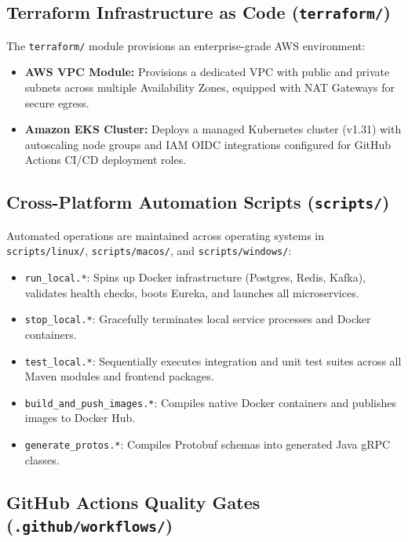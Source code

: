 \documentclass[12pt, a4paper]{article}
\begin{document}
\subsection{Terraform Infrastructure as Code (\texttt{terraform/})}

The \texttt{terraform/} module provisions an enterprise-grade AWS environment:
\begin{itemize}[leftmargin=*, itemsep=4pt]
    \item \textbf{AWS VPC Module:} Provisions a dedicated VPC with public and private subnets across multiple Availability Zones, equipped with NAT Gateways for secure egress.
    \item \textbf{Amazon EKS Cluster:} Deploys a managed Kubernetes cluster (v1.31) with autoscaling node groups and IAM OIDC integrations configured for GitHub Actions CI/CD deployment roles.
\end{itemize}

\subsection{Cross-Platform Automation Scripts (\texttt{scripts/})}

Automated operations are maintained across operating systems in \texttt{scripts/linux/}, \texttt{scripts/macos/}, and \texttt{scripts/windows/}:
\begin{itemize}[noitemsep]
    \item \texttt{run\_local.*}: Spins up Docker infrastructure (Postgres, Redis, Kafka), validates health checks, boots Eureka, and launches all microservices.
    \item \texttt{stop\_local.*}: Gracefully terminates local service processes and Docker containers.
    \item \texttt{test\_local.*}: Sequentially executes integration and unit test suites across all Maven modules and frontend packages.
    \item \texttt{build\_and\_push\_images.*}: Compiles native Docker containers and publishes images to Docker Hub.
    \item \texttt{generate\_protos.*}: Compiles Protobuf schemas into generated Java gRPC classes.
\end{itemize}

\subsection{GitHub Actions Quality Gates (\texttt{.github/workflows/})}
\end{document}
